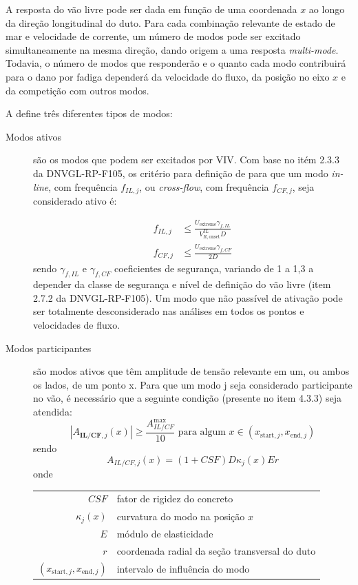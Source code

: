 A resposta do vão livre pode ser dada em função de uma coordenada $x$ ao longo da direção longitudinal do duto.
Para cada combinação relevante de estado de mar e velocidade de corrente, um número de modos pode ser excitado simultaneamente na mesma direção, dando origem a uma resposta \textit{multi-mode}.
Todavia, o número de modos que responderão e o quanto cada modo contribuirá para o dano por fadiga dependerá da velocidade do fluxo, da posição no eixo $x$ e da competição com outros modos.

A  define três diferentes tipos de modos:
\begin{description}
	\item[Modos ativos] são os modos que podem ser excitados por VIV. Com base no itém 2.3.3 da DNVGL-RP-F105, os critério para definição de para que um modo \textit{in-line}, com frequência $f_{IL,j}$, ou \textit{cross-flow}, com frequência $f_{CF,j}$, seja considerado ativo é:

    \begin{equation}
        \begin{aligned}
        f_{I L, j} & \leq \frac{U_{\text{extreme}} \gamma_{f,IL}}{V_{R,\text{onset}}^{IL} D} \\
        f_{C F, j} & \leq \frac{U_{\text{extreme}} \gamma_{f,CF}}{2D}
        \end{aligned}
    \end{equation}
    sendo $\gamma_{f,IL}$ e $\gamma_{f,CF}$ coeficientes de segurança, variando de 1 a 1,3 a depender da classe de segurança e nível de
    definição do vão livre (item 2.7.2 da DNVGL-RP-F105).
    Um modo que não passível de ativação pode ser totalmente desconsiderado nas análises em todos os pontos e velocidades de fluxo.

    \item[Modos participantes] são modos ativos que têm amplitude de tensão relevante em um, ou ambos os lados, de um ponto x. Para que um modo j seja considerado participante no vão, é necessário que a seguinte condição (presente no item 4.3.3) seja atendida:
    $$
    \left|A_{\textbf{IL/CF}, j}(x)\right| \geq \frac{A_{IL/CF}^{\max}}{10} \text{ para algum } x \in (x_{\text{start},j}, x_{\text{end}, j})
    $$
    sendo
    $$
    A_{IL/CF, j}(x) = (1+CSF) D \kappa_{j}(x) E r
    $$
    onde

    \begin{tabular}{rl}
        $\mathit{CSF}$                            & fator de rigidez do concreto\\
        $\kappa_{j}(x)$                           & curvatura do modo na posição $x$\\
        $E$                                       & módulo de elasticidade\\
        $r$                                       & coordenada radial da seção transversal do duto\\
        $(x_{\text{start},j}, x_{\text{end}, j})$ & intervalo de influência do modo
    \end{tabular}


\end{description}
